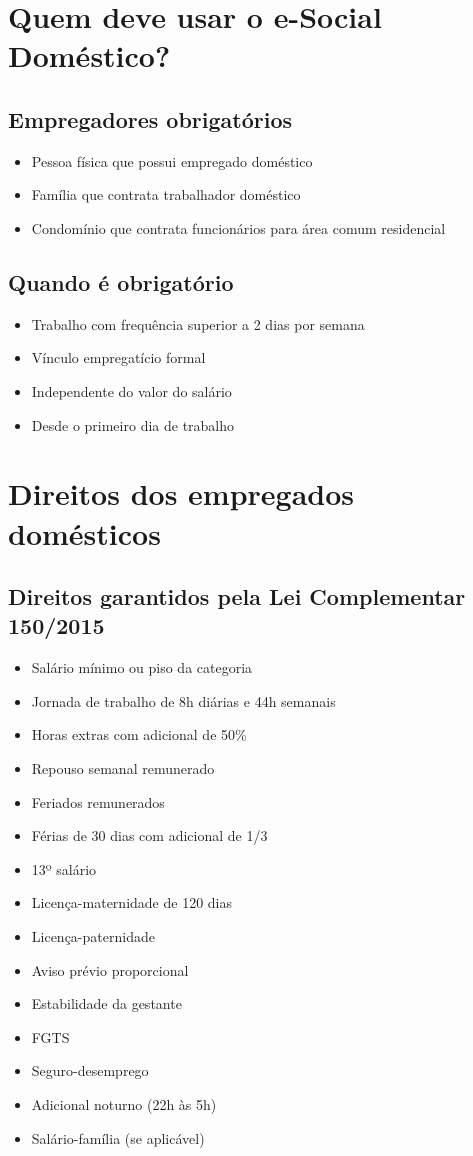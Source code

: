 \documentclass[12pt,a4paper]{article}
\begin{document}
\section{Quem deve usar o e-Social Doméstico?}

\subsection{Empregadores obrigatórios}
\begin{itemize}
    \item Pessoa física que possui empregado doméstico
    \item Família que contrata trabalhador doméstico
    \item Condomínio que contrata funcionários para área comum residencial
\end{itemize}

\subsection{Quando é obrigatório}
\begin{itemize}
    \item Trabalho com frequência superior a 2 dias por semana
    \item Vínculo empregatício formal
    \item Independente do valor do salário
    \item Desde o primeiro dia de trabalho
\end{itemize}

\section{Direitos dos empregados domésticos}

\subsection{Direitos garantidos pela Lei Complementar 150/2015}
\begin{itemize}
    \item Salário mínimo ou piso da categoria
    \item Jornada de trabalho de 8h diárias e 44h semanais
    \item Horas extras com adicional de 50\%
    \item Repouso semanal remunerado
    \item Feriados remunerados
    \item Férias de 30 dias com adicional de 1/3
    \item 13º salário
    \item Licença-maternidade de 120 dias
    \item Licença-paternidade
    \item Aviso prévio proporcional
    \item Estabilidade da gestante
    \item FGTS
    \item Seguro-desemprego
    \item Adicional noturno (22h às 5h)
    \item Salário-família (se aplicável)
\end{itemize}
\end{document}
